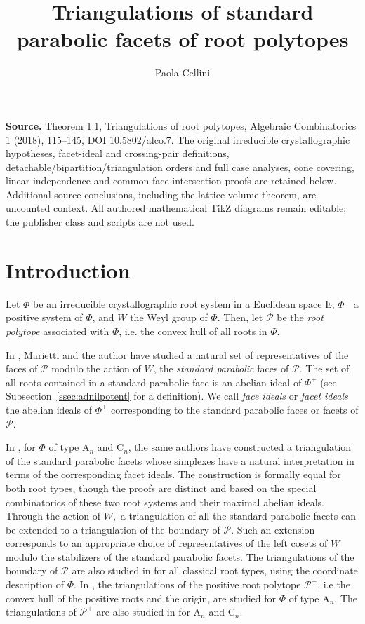 \documentclass[10pt]{amsart}
\title{Triangulations of standard parabolic facets of root polytopes}
\author{Paola Cellini}
\date{}
\theoremstyle{definition}
\theoremstyle{remark}
\newcommand\pol{\mathcal P}
\begin{document}
\maketitle
\noindent\textbf{Source.} Theorem 1.1, Triangulations of root polytopes, Algebraic Combinatorics 1 (2018), 115--145, DOI 10.5802/alco.7. The original irreducible crystallographic hypotheses, facet-ideal and crossing-pair definitions, detachable/bipartition/triangulation orders and full case analyses, cone covering, linear independence and common-face intersection proofs are retained below. Additional source conclusions, including the lattice-volume theorem, are uncounted context. All authored mathematical TikZ diagrams remain editable; the publisher class and scripts are not used.
\section{Introduction}\label{sec:intro}

\par
Let $\Phi$ be an irreducible crystallographic root system in a Euclidean space $\mathrm E$, $\Phi^+$ a positive system of $\Phi$, and $W$ the Weyl group of $\Phi$. 
Then, let  $\pol$ be the {\it root polytope} associated with $\Phi$, i.e. the convex hull of all  roots in $\Phi$. 

\par 
In \cite{CM1}, Marietti and the author have studied a natural set of representatives of the faces of $\pol$ modulo the action of $W$, the {\it standard parabolic} faces of $\pol$.  
The set of all roots contained in a standard parabolic face is an abelian ideal of  $\Phi^+$ (see Subsection~\ref{ssec:adnilpotent} for a definition). 
We call {\it face ideals} or {\it facet ideals} the  abelian ideals of $\Phi^+$ corresponding to the standard parabolic faces or facets of $\pol$.

\par
In \cite{CM2}, for $\Phi$ of type $\mathrm A_n$ and $\mathrm C_n$,
the same authors have constructed a triangulation of the standard parabolic facets whose simplexes have a natural interpretation in terms of the corresponding facet ideals. 
The construction is formally equal for both root types, though the proofs are distinct and based on the special combinatorics of these two root systems and their maximal abelian ideals.  
Through the action of $W,$ a triangulation of all the standard parabolic facets can be extended to a triangulation of the boundary of $\pol$. 
Such an extension corresponds to an appropriate choice of representatives of the left cosets of $W$ modulo  the stabilizers of the standard parabolic facets.
The triangulations of the boundary of $\pol$ are also studied in  \cite{Ard} for all classical root types, using the coordinate description of $\Phi$.
In \cite{GGP}, the triangulations of the positive root polytope $\pol^+$, i.e the convex hull of the positive roots and the origin,  are studied for $\Phi$ of type $\mathrm A_n$.
The triangulations of $\pol^+$ are also studied in \cite{Mesz1, Mesz2} for $\mathrm A_n$ and $\mathrm C_n$.
\end{document}
